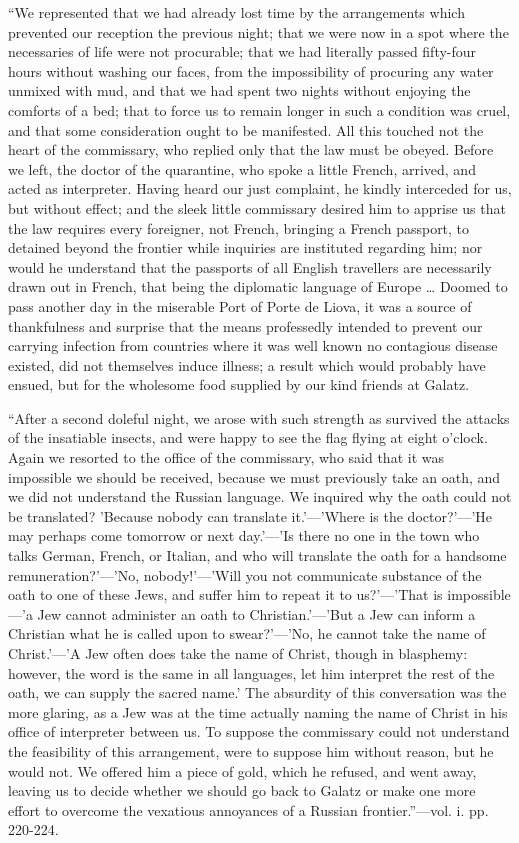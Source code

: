 ``We
represented that we had already lost time by the arrangements which
prevented our reception the previous night; that we were now in a spot
where the necessaries of life were not procurable; that we had literally
passed fifty-four hours without washing our faces, from the
impossibility of procuring any water unmixed with mud, and that we had
spent two nights without enjoying the comforts of a bed; that to force
us to remain longer in such a condition was cruel, and that some
consideration ought to be manifested. All this touched not the heart of
the commissary, who replied only that the law must be obeyed. Before we
left, the doctor of the quarantine, who spoke a little French, arrived,
and acted as interpreter. Having heard our just complaint, he kindly
interceded for us, but without effect; and the sleek little commissary
desired him to apprise us that the law requires every foreigner, not
French, bringing a French passport, to detained beyond the frontier
while inquiries are instituted regarding him; nor would he understand
that the passports of all English travellers are necessarily drawn out
in French, that being the diplomatic language of Europe … Doomed to
pass another day in the miserable Port of Porte de Liova, it was a
source of thankfulness and surprise that the means professedly intended
to prevent our carrying infection from countries where it was well known
no contagious disease existed, did not themselves induce illness; a
result which would probably have ensued, but for the wholesome food
supplied by our kind friends at Galatz.

``After
a second doleful night, we arose with such strength as survived the
attacks of the insatiable insects, and were happy to see the flag flying
at eight o'clock. Again we resorted to the office of the commissary, who
said that it was impossible we should be received, because we must
previously take an oath, and we did not understand the Russian language.
We inquired why the oath could not be translated? 'Because nobody can
translate it.'—'Where is the doctor?'—'He may perhaps come tomorrow
or next day.'—'Is there no one in the town who talks German, French,
or Italian, and who will translate the oath for a handsome remuneration?'—'No,
nobody!'—'Will you not communicate substance of the oath to one of
these Jews, and suffer him to repeat it to us?'—'That is impossible—'a
Jew cannot administer an oath to Christian.'—'But a Jew can inform a
Christian what he is called upon to swear?'—'No, he cannot take the
name of Christ.'—'A Jew often does take the name of Christ, though in
blasphemy: however, the word is the same in all languages, let him
interpret the rest of the oath, we can supply the sacred name.' The
absurdity of this conversation was the more glaring, as a Jew was at the
time actually naming the name of Christ in his office of interpreter
between us. To suppose the commissary could not understand the
feasibility of this arrangement, were to suppose him without reason, but
he would not. We offered him a piece of gold, which he refused, and went
away, leaving us to decide whether we should go back to Galatz or make
one more effort to overcome the vexatious annoyances of a Russian
frontier.''—vol. i. pp. 220-224.

